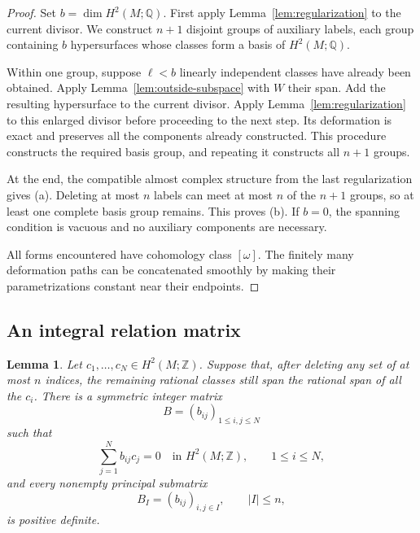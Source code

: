 \documentclass[11pt]{amsart}
\newtheorem{lemma}[theorem]{Lemma}
\theoremstyle{definition}
\theoremstyle{remark}
\newcommand{\Q}{\mathbb Q}
\newcommand{\Z}{\mathbb Z}
\begin{document}
\begin{proof}
Set $b=\dim H^2(M;\Q)$.  First apply
Lemma~\ref{lem:regularization} to the current divisor.
We construct $n+1$ disjoint groups of auxiliary labels, each
group containing $b$ hypersurfaces whose classes form a basis
of $H^2(M;\Q)$.

Within one group, suppose $\ell<b$ linearly independent classes
have already been obtained.  Apply
Lemma~\ref{lem:outside-subspace} with $W$ their span.  Add the
resulting hypersurface to the current divisor.  Apply
Lemma~\ref{lem:regularization} to this enlarged divisor before
proceeding to the next step.  Its deformation is exact and
preserves all the components already constructed.  This
procedure constructs the required basis group, and repeating
it constructs all $n+1$ groups.

At the end, the compatible almost complex structure from the
last regularization gives (a).  Deleting at most $n$ labels can
meet at most $n$ of the $n+1$ groups, so at least one complete
basis group remains.  This proves (b).  If $b=0$, the spanning
condition is vacuous and no auxiliary components are necessary.

All forms encountered have cohomology class $[\omega]$.
The finitely many deformation paths can be concatenated
smoothly by making their parametrizations constant near their
endpoints.
\end{proof}

\subsection{An integral relation matrix}

\begin{lemma}\label{lem:matrix}
Let $c_1,\ldots,c_N\in H^2(M;\Z)$.  Suppose that, after deleting
any set of at most $n$ indices, the remaining rational classes
still span the rational span of all the $c_i$.
There is a symmetric integer matrix
\[
B=(b_{ij})_{1\leq i,j\leq N}
\]
such that
\[
\sum_{j=1}^{N}b_{ij}c_j=0
\quad\text{in }H^2(M;\Z),\qquad 1\leq i\leq N,
\]
and every nonempty principal submatrix
\[
B_I=(b_{ij})_{i,j\in I},\qquad |I|\leq n,
\]
is positive definite.
\end{lemma}
\end{document}
